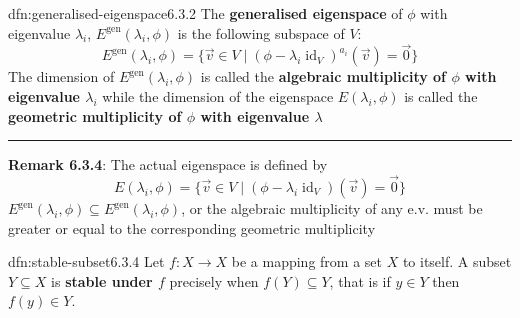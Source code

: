 \documentclass[landscape, 8pt]{extarticle}
\DeclareMathOperator{\id}{id}
\begin{document}
\begin{multicols}{3}
\begin{dfn}{dfn:generalised-eigenspace}{6.3.2}
    The \textbf{generalised eigenspace} of $\phi$ with eigenvalue $\lambda_{i}$, $E^{\text{gen}}(\lambda_{i}, \phi)$ is the following subspace of $V$:
    \[E^{\text{gen}}(\lambda_{i}, \phi) = \{\vec{v}\in V \mid (\phi - \lambda_{i} \id_{V})^{a_{i}} (\vec{v}) = \vec{0}\}\]
    The dimension of $E^{\text{gen}}(\lambda_{i}, \phi)$ is called the \textbf{algebraic multiplicity of $\phi$ with eigenvalue $\lambda_{i}$} while the dimension of the eigenspace $E(\lambda_{i}, \phi)$ is called the \textbf{geometric multiplicity of $\phi$ with eigenvalue $\lambda$}

    \noindent\rule{\textwidth}{0.2pt}
    \textbf{Remark 6.3.4}: The actual eigenspace is defined by
    \[E(\lambda_{i}, \phi) = \{\vec{v}\in V \mid (\phi - \lambda_{i} \id_{V}) (\vec{v}) = \vec{0}\}\]
    $E^{\text{gen}}(\lambda_{i}, \phi) \subseteq E^{\text{gen}}(\lambda_{i}, \phi)$, or the algebraic multiplicity of any e.v. must be greater or equal to the corresponding geometric multiplicity


\end{dfn}

\begin{dfn}{dfn:stable-subset}{6.3.4}
    Let $f : X \to X$ be a mapping from a set $X$ to itself. A subset $Y \subseteq X$ is \textbf{stable under $f$} precisely when $f(Y) \subseteq Y$, that is if $y\in Y$ then $f(y)\in Y$.
\end{dfn}


\end{multicols}
\end{document}
